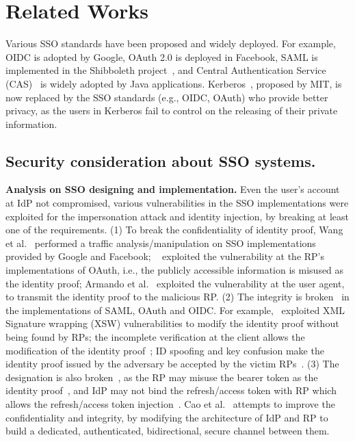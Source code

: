 \section{Related Works}%
\label{sec:related}
Various SSO  standards have been proposed and widely deployed. For example, OIDC is adopted by Google, OAuth 2.0 is deployed in Facebook, SAML is implemented in the Shibboleth project~\cite{Shibboleth}, and Central Authentication Service (CAS)~\cite{aubry2004esup} is widely adopted by Java applications.
Kerberos~\cite{Kerberos}, proposed by MIT, is now replaced by the SSO standards (e.g., OIDC, OAuth) who provide better privacy, as the users in Kerberos fail to control on the releasing of their private information.

\subsection{Security consideration about SSO systems.} 
\noindent\textbf{Analysis on SSO designing and implementation.} Even the user's account at IdP not compromised, various vulnerabilities in the SSO implementations were exploited for the impersonation attack and identity injection, by
 breaking at least one of the requirements. %
(1) To break the confidentiality of identity proof,  Wang et al.~\cite{WangCW12} performed a traffic analysis/manipulation on SSO implementations provided by Google and Facebook; ~\cite{ZhouE14,WangZLG16,YangLLZH16} exploited the vulnerability at the RP's implementations of OAuth, i.e., the publicly accessible information is misused as the identity proof;
Armando et al.~\cite{ArmandoCCCPS13} exploited the vulnerability at the user agent, to transmit the identity proof to the malicious RP.
(2) The integrity is broken~\cite{SomorovskyMSKJ12,WangCW12,ZhouE14,WangZLG16,YangLLZH16,MainkaMS16, MainkaMSW17} in the implementations of  SAML, OAuth and OIDC.
For example,~\cite{SomorovskyMSKJ12} exploited XML Signature wrapping (XSW) vulnerabilities to modify the identity proof without being found by RPs;
the incomplete verification at the client allows the modification of the identity proof~\cite{ZhouE14,WangZLG16,YangLLZH16};
ID spoofing and key confusion make the identity proof issued by the adversary be accepted by the victim RPs~\cite{MainkaMS16, MainkaMSW17}.
(3) The designation is also broken~\cite{ZhouE14,WangZLG16,YangLLZH16,YangLCZ18}, as the RP may misuse the bearer token  as the identity proof~\cite{ZhouE14,WangZLG16,YangLLZH16}, and IdP may not bind the refresh/access token with RP which allows the refresh/access token injection~\cite{YangLCZ18}.
Cao et al.~\cite{CaoSBKVC14} attempts to improve the confidentiality and integrity, by modifying the architecture of IdP and RP to build a dedicated, authenticated, bidirectional, secure channel between them.
 


